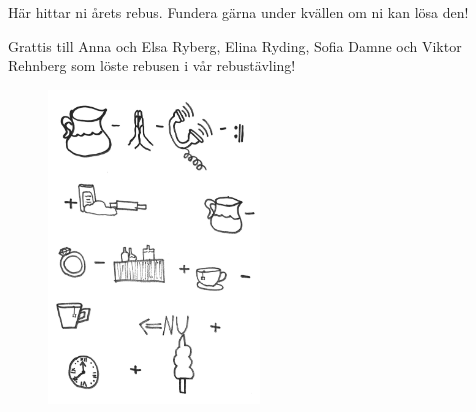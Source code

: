 
\hfill

Här hittar ni årets rebus. Fundera gärna under kvällen om ni kan lösa den!

\vspace{9pt}

Grattis till Anna och Elsa Ryberg, Elina Ryding, Sofia Damne och Viktor Rehnberg som löste rebusen i vår rebustävling!

\hfill
\begin{figure}[hbt!]
    \centering
    \includegraphics[width=0.5\textwidth]{Bilder/Rebus/Rebus-2022.jpg}
    \label{fig:my_label}
\end{figure}


\vfil


